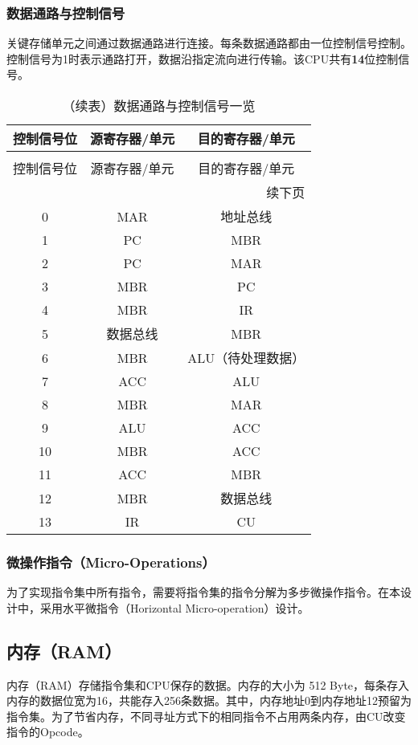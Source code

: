 \documentclass[lang=cn,a4paper,newtx]{elegantpaper}
\begin{document}
\subsubsection{数据通路与控制信号}
关键存储单元之间通过数据通路进行连接。每条数据通路都由一位控制信号控制。控制信号为1时表示通路打开，数据沿指定流向进行传输。该CPU共有\textbf{14}位控制信号。
\begin{longtable}{c c c}
  \caption{数据通路与控制信号一览} \label{tab:CPU:DataPath} \\
  \toprule
  控制信号位 & 源寄存器/单元  & 目的寄存器/单元  \\
  \midrule
  \endfirsthead

  \caption[]{（续表）数据通路与控制信号一览} \\
  \toprule
  控制信号位 & 源寄存器/单元  & 目的寄存器/单元  \\
  \midrule
  \endhead

  \midrule
  \multicolumn{3}{r}{续下页} \\
  \midrule
  \endfoot

  \bottomrule
  \endlastfoot

  0  & MAR   & 地址总线  \\
  1  & PC    & MBR  \\
  2  & PC    & MAR  \\
  3  & MBR   & PC  \\
  4  & MBR   & IR  \\
  5  & 数据总线 & MBR  \\
  6  & MBR   & ALU（待处理数据） \\
  7  & ACC   & ALU  \\
  8  & MBR   & MAR  \\
  9  & ALU   & ACC  \\
  10 & MBR   & ACC  \\
  11 & ACC   & MBR  \\
  12 & MBR   & 数据总线  \\
  13 & IR    & CU  \\
\end{longtable}

\subsubsection{微操作指令（Micro-Operations）}
为了实现指令集中所有指令，需要将指令集的指令分解为多步微操作指令。在本设计中，采用水平微指令（Horizontal Micro-operation）设计。



\subsection{内存（RAM）}
内存（RAM）存储指令集和CPU保存的数据。内存的大小为 512 Byte，每条存入内存的数据位宽为16，共能存入256条数据。其中，内存地址0到内存地址12预留为指令集。为了节省内存，不同寻址方式下的相同指令不占用两条内存，由CU改变指令的Opcode。
\end{document}
